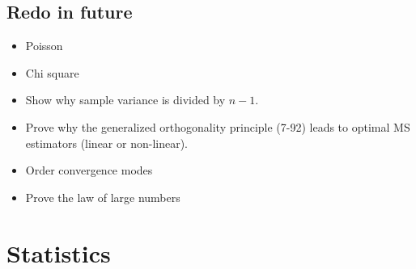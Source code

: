 \documentclass[a4paper]{book}
\begin{document}
\section{Redo in future}
\begin{itemize}
\item Poisson
\item Chi square 
\item Show why sample variance is divided by $n-1$.
\item Prove why the generalized orthogonality principle (7-92) leads to optimal MS estimators (linear or non-linear).
\item Order convergence modes
\item Prove the law of large numbers
\end{itemize}









\chapter{Statistics}
\end{document}
